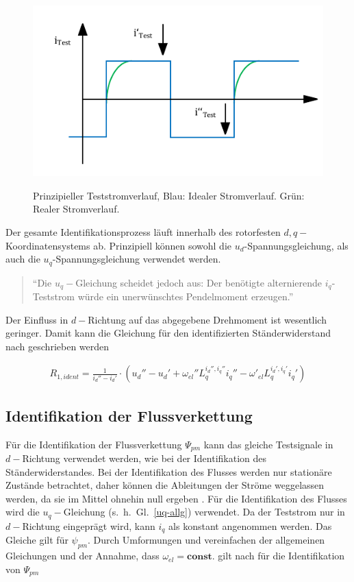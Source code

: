 \documentclass[conference,twocolumn]{IEEEtran}
\begin{document}
\begin{figure}
\includegraphics[width=\columnwidth]{img/test-strom}
\label{fig:test-strom}
\caption{Prinzipieller Teststromverlauf, Blau: Idealer Stromverlauf. Grün: Realer Stromverlauf.}
\end{figure}

Der gesamte Identifikationsprozess läuft innerhalb des rotorfesten $d, q-$Koordinatensystems ab.
Prinzipiell können sowohl die $u_d$-Spannungsgleichung, als auch die $u_q$-Spannungsgleichung verwendet werden.

\begin{quote}
\enquote{Die $u_q-$Gleichung scheidet jedoch aus: Der benötigte alternierende $i_q$-Teststrom würde ein unerwünschtes Pendelmoment erzeugen.}\autocite[S.~148]{Kellner2012}
\end{quote}

Der Einfluss in $d-$Richtung auf das abgegebene Drehmoment ist wesentlich geringer.
Damit kann die Gleichung für den identifizierten Ständerwiderstand nach \textcite{Kellner2012} geschrieben werden

\begin{align}
R_{1,ident} = \frac{1}{i_d''-i_d'} \cdot \left( u_d'' - u_d' + \omega_{el}'' L_q^{i_d'',i_q''}i_q'' - \omega'_{el}L_q^{i_d',i_q'}i_q' \right)
\end{align}

\subsection{Identifikation der Flussverkettung}\label{sec:ident-fluss}

Für die Identifikation der Flussverkettung $\Psi_{pm}$ kann das gleiche Testsignale in $d-$Richtung verwendet werden, wie bei der Identifikation des Ständerwiderstandes.
Bei der Identifikation des Flusses werden nur stationäre Zustände betrachtet, daher können die Ableitungen der Ströme weggelassen werden, da sie im Mittel ohnehin null ergeben \autocite{Kellner2012}.
Für die Identifikation des Flusses wird die $u_q-$Gleichung (s.~h.~Gl.~\ref{uq-allg}) verwendet.
Da der Teststrom nur in $d-$Richtung eingeprägt wird, kann $i_q$ als konstant angenommen werden.
Das Gleiche gilt für $\psi_{pm}$.
Durch Umformungen und vereinfachen der allgemeinen Gleichungen und der Annahme, dass $\omega_{el}=\textbf{const.}$ gilt nach \textcite{Kellner2012} für die Identifikation von $\Psi_{pm}$
\end{document}

